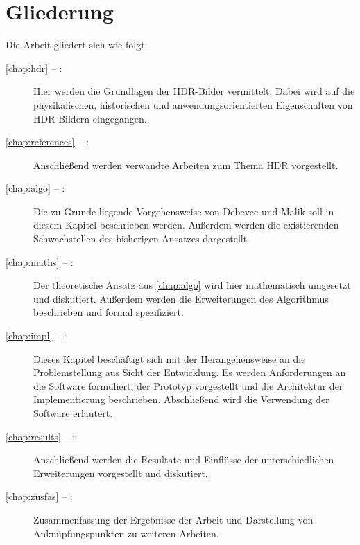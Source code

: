 \section{Gliederung}
Die Arbeit gliedert sich wie folgt:
\begin{description}

\item[\autoref{chap:hdr} -- :] Hier werden die Grundlagen der \gls{HDR}-Bilder vermittelt. Dabei wird auf die physikalischen, historischen und anwendungsorientierten Eigenschaften von \gls{HDR}-Bildern eingegangen.

\item[\autoref{chap:references} -- :] Anschließend werden verwandte Arbeiten zum Thema \gls{HDR} vorgestellt.

\item[\autoref{chap:algo} -- :] Die zu Grunde liegende Vorgehensweise von Debevec und Malik soll in diesem Kapitel beschrieben werden. Außerdem werden die existierenden Schwachstellen des bisherigen Ansatzes dargestellt.

\item[\autoref{chap:maths} -- :] Der theoretische Ansatz aus \autoref{chap:algo} wird hier mathematisch umgesetzt und diskutiert. Außerdem werden die Erweiterungen des Algorithmus beschrieben und formal spezifiziert.

\item[\autoref{chap:impl} -- :] Dieses Kapitel beschäftigt sich mit der Herangehensweise an die Problemstellung aus Sicht der Entwicklung. Es werden Anforderungen an die Software formuliert, der Prototyp vorgestellt und die Architektur der Implementierung beschrieben. Abschließend wird die Verwendung der Software erläutert.

\item[\autoref{chap:results} -- :] Anschließend werden die Resultate und Einflüsse der unterschiedlichen Erweiterungen vorgestellt und diskutiert.

\item[\autoref{chap:zusfas} -- :] Zusammenfassung der Ergebnisse der Arbeit und Darstellung von Anknüpfungspunkten zu weiteren Arbeiten.
\end{description}
